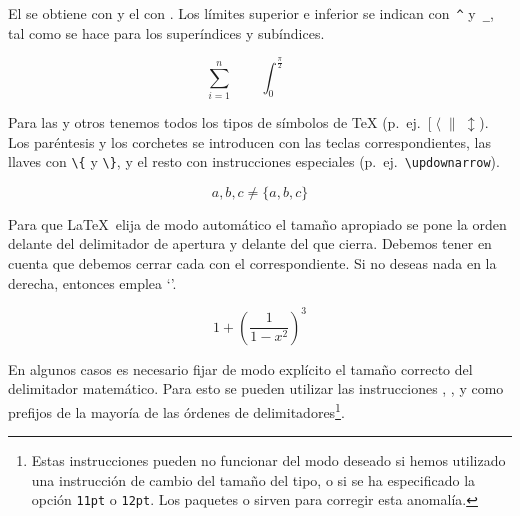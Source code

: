 \medskip

El  \textbf{}  se  obtiene  con   y  el
\textbf{} con  . Los límites superior e
inferior se indican con~\verb|^| y~\verb|_|, tal como se hace para los
superíndices y subíndices.

\begin{example}
\begin{displaymath}
\sum_{i=1}^{n} \qquad
\int_{0}^{\frac{\pi}{2}} \qquad
\end{displaymath}
\end{example}

Para    las    \textbf{}   y    otros    
tenemos     todos    los     tipos    de     símbolos    de     \TeX{}
(p.~ej.~$[\;\langle\;\|\;\updownarrow$).   Los    paréntesis   y   los
corchetes se  introducen con  las teclas correspondientes,  las llaves
con \verb|\{|  y \verb|\}|,  y el  resto con  instrucciones especiales
(p.~ej.~\verb|\updownarrow|).

\begin{example}
\begin{displaymath}
{a,b,c}\neq\{a,b,c\}
\end{displaymath}
\end{example}

Para que \LaTeX\ elija de modo  automático el tamaño apropiado se pone
la orden   delante del  delimitador de apertura  y 
delante del  que cierra.  Debemos tener en  cuenta que  debemos cerrar
cada  con el  correspondiente. Si no deseas nada en
la derecha, entonces emplea `'.


\begin{example}
\begin{displaymath}
1 + \left( \frac{1}{ 1-x^{2} }
    \right) ^3
\end{displaymath}
\end{example}


En     algunos     casos     es    necesario     fijar     de     modo
explícito      el      tamaño       correcto      del      delimitador
matemático.  Para esto  se pueden
utilizar   las   instrucciones   ,   ,      y
   como  prefijos   de   la  mayoría   de   las  órdenes   de
delimitadores\footnote{Estas  instrucciones  pueden no  funcionar  del
modo  deseado  si  hemos  utilizado  una  instrucción  de  cambio  del
tamaño del  tipo, o si  se ha  especificado la opción  \texttt{11pt} o
\texttt{12pt}. Los  paquetes  o   sirven para
corregir esta anomalía.}.

